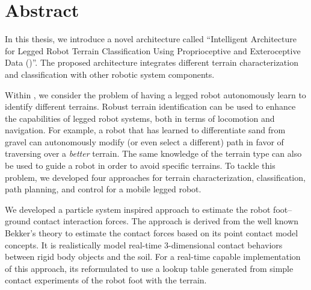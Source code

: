 \chapter*{Abstract}
In this thesis, we introduce a novel architecture called ``Intelligent Architecture for Legged Robot Terrain Classification Using Proprioceptive and Exteroceptive Data (\art)''. The proposed architecture integrates different terrain characterization and classification with other robotic system components.

Within \art, we consider the problem of having a legged robot autonomously learn to identify different terrains. Robust terrain identification can be used to enhance the capabilities of legged robot systems, both in terms of locomotion and navigation. For example, a robot that has learned to differentiate sand from gravel can autonomously modify (or even select a different) path in favor of traversing over a \emph{better} terrain. The same knowledge of the terrain type can also be used to guide a robot in order to avoid specific terrains. To tackle this problem, we developed four approaches for terrain characterization, classification, path planning, and control for a mobile legged robot. 

We developed a particle system inspired approach to estimate the robot foot--ground contact interaction forces.
The approach is derived from the well known Bekker's theory to estimate the contact forces based on its point contact model concepts. It is realistically model real-time 3-dimensional contact behaviors between rigid body objects and the soil. For a real-time capable implementation of this approach, its reformulated to use a lookup table generated from simple contact experiments of the robot foot with the terrain.

